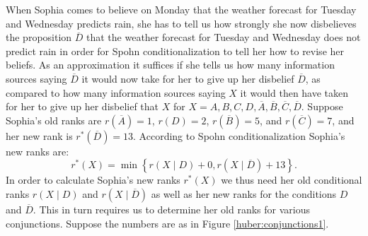 When Sophia comes to believe on Monday that the weather forecast for Tuesday and Wednesday predicts rain, she has to tell us how strongly she now disbelieves the proposition $\overline{D}$ that the weather forecast for Tuesday and Wednesday does not predict rain in order for Spohn conditionalization to tell her how to revise her beliefs. As an approximation it suffices if she tells us how many information sources saying $\overline{D}$ it would now take for her to give up her disbelief $\overline{D}$, as compared to how many information sources saying $X$ it would then have taken for her to give up her disbelief that $X$ for $X=A,B,C,D,\overline{A},\overline{B},\overline{C},\overline{D}$. Suppose Sophia's old ranks are $r\left(\overline{A}\right)=1$, $r\left(D\right)=2$, $r\left(\overline{B}\right)=5$, and $r\left(\overline{C}\right)=7$, and her new rank is $r^*\left(\overline{D}\right)=13$. According to Spohn conditionalization Sophia's new ranks are:%
$$r^*\left(X\right)=\min\left\{r\left(X\mid D\right)+0,r\left(X\mid\overline{D}\right)+13\right\}.$$
In order to calculate Sophia's new ranks $r^*\left(X\right)$ we thus need her old conditional ranks $r\left(X\mid D\right)$ and $r\left(X\mid\overline{D}\right)$ as well as her new ranks for the conditions $D$ and $\overline{D}$. This in turn requires us to determine her old ranks for various conjunctions. Suppose %
the numbers are as in Figure \ref{huber:conjunctions1}.
